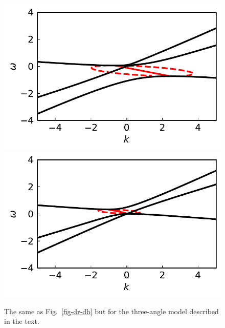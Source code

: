 
\begin{figure}[!htb]
      \includegraphics[width=\linewidth]{chapters/assets/dr/spectDB3WC4DRDBMZAPltBlob}
    \endminipage\hfill
      \includegraphics[width=\linewidth]{chapters/assets/dr/spectDB3WC4DRDBMAAPltBlob}
    \endminipage\hfill
    \caption{The same as Fig.~\ref{fig-dr-db} but for the three-angle model described in the text.}
    \label{fig-dr-db-3}
\end{figure}


